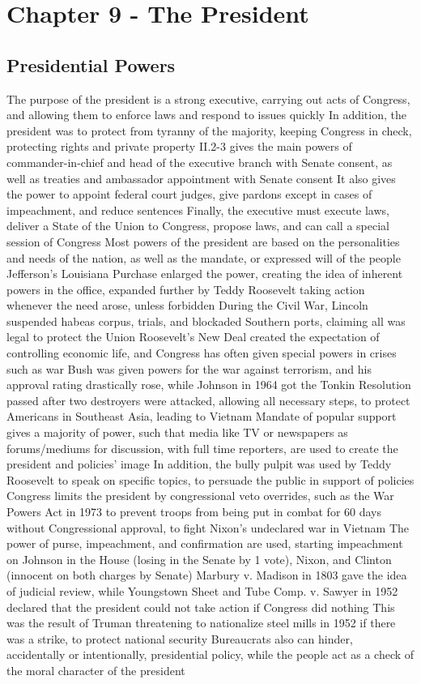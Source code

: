 \documentclass[11 pt, twoside]{article}
\newenvironment{outline*}
{
	\begin{outline}[enumerate]
	}
	{\end{outline}
}
\begin{document}
\section{Chapter 9 - The President}
\subsection{Presidential Powers}
\begin{outline*}
\1 The purpose of the president is a strong executive, carrying out acts of Congress, and allowing them to enforce laws and respond to issues quickly
\2 In addition, the president was to protect from tyranny of the majority, keeping Congress in check, protecting rights and private property
\2 II.2-3 gives the main powers of commander-in-chief and head of the executive branch with Senate consent, as well as treaties and ambassador appointment with Senate consent
\2 It also gives the power to appoint federal court judges, give pardons except in cases of impeachment, and reduce sentences
\2 Finally, the executive must execute laws, deliver a State of the Union to Congress, propose laws, and can call a special session of Congress
\1 Most powers of the president are based on the personalities and needs of the nation, as well as the mandate, or expressed will of the people
\2 Jefferson’s Louisiana Purchase enlarged the power, creating the idea of inherent powers in the office, expanded further by Teddy Roosevelt taking action whenever the need arose, unless forbidden
\2 During the Civil War, Lincoln suspended habeas corpus, trials, and blockaded Southern ports, claiming all was legal to protect the Union
\2 Roosevelt’s New Deal created the expectation of controlling economic life, and Congress has often given special powers in crises such as war
\2 Bush was given powers for the war against terrorism, and his approval rating drastically rose, while Johnson in 1964 got the Tonkin Resolution passed after two destroyers were attacked, allowing all necessary steps, to protect Americans in Southeast Asia, leading to Vietnam
\2 Mandate of popular support gives a majority of power, such that media like TV or newspapers as forums/mediums for discussion, with full time reporters, are used to create the president and policies’ image
\2 In addition, the bully pulpit was used by Teddy Roosevelt to speak on specific topics, to persuade the public in support of policies
\1 Congress limits the president by congressional veto overrides, such as the War Powers Act in 1973 to prevent troops from being put in combat for 60 days without Congressional approval, to fight Nixon’s undeclared war in Vietnam
\2 The power of purse, impeachment, and confirmation are used, starting impeachment on Johnson in the House (losing in the Senate by 1 vote), Nixon, and Clinton (innocent on both charges by Senate)
\1 Marbury v. Madison in 1803 gave the idea of judicial review, while Youngstown Sheet and Tube Comp. v. Sawyer in 1952 declared that the president could not take action if Congress did nothing
\2 This was the result of Truman threatening to nationalize steel mills in 1952 if there was a strike, to protect national security
\1 Bureaucrats also can hinder, accidentally or intentionally, presidential policy, while the people act as a check of the moral character of the president
\end{outline*}
\end{document}
